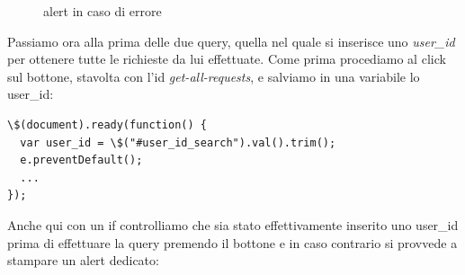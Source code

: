 \documentclass[a4paper,12pt, oneside]{book}
\begin{document}
\begin{figure}[H]
\begin{minipage}{.5\textwidth}
  \caption{alert in caso di errore}
\end{minipage}
\end{figure}
Passiamo ora alla prima delle due query, quella nel quale si inserisce uno \textit{user\_id} per ottenere tutte le richieste da lui effettuate. Come prima procediamo al click sul bottone, stavolta con l'id \textit{get-all-requests}, e salviamo in una variabile lo user_id:

\begin{shaded}
\begin{verbatim}
\$(document).ready(function() {
  var user_id = \$("#user_id_search").val().trim();
  e.preventDefault();
  ...
});
\end{verbatim}
\end{shaded}
Anche qui con un if controlliamo che sia stato effettivamente inserito uno user\_id prima di effettuare la query premendo il bottone e in caso contrario si provvede a stampare un alert dedicato:
\end{document}
